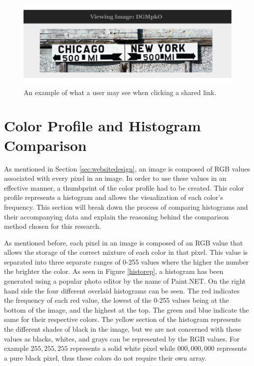 \begin{figure}[htbp]
\centering
\includegraphics[width=5.5in]{viewimage}
\caption{An example of what a user may see when clicking a shared link.}
\label{viewimage}
\end{figure}

\section{Color Profile and Histogram Comparison} \label{sec:histogram}
As mentioned in Section \ref{sec:websitedesign}, an image is composed of RGB values associated with every pixel in an image. In order to use these values in an effective manner, a thumbprint of the color profile had to be created. This color profile represents a histogram and allows the visualization of each color's frequency. This section will break down the process of comparing histograms and their accompanying data and explain the reasoning behind the comparison method chosen for this research.

As mentioned before, each pixel in an image is composed of an RGB value that allows the storage of the correct mixture of each color in that pixel. This value is separated into three separate ranges of 0-255 values where the higher the number the brighter the color. As seen in Figure \ref{historep}, a histogram has been generated using a popular photo editor by the name of Paint.NET. On the right hand side the four different overlaid histograms can be seen. The red indicates the frequency of each red value, the lowest of the 0-255 values being at the bottom of the image, and the highest at the top. The green and blue indicate the same for their respective colors. The yellow section of the histogram represents the different shades of black in the image, but we are not concerned with these values as blacks, whites, and grays can be represented by the RGB values. For example $255,255,255$ represents a solid white pixel while $000,000,000$ represents a pure black pixel, thus these colors do not require their own array.

